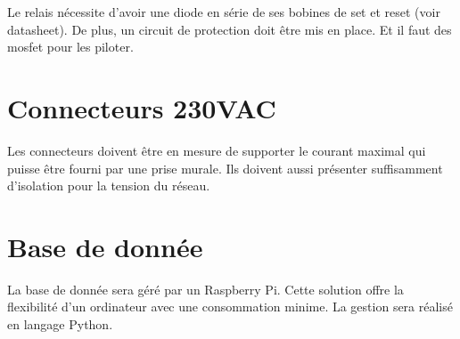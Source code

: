 Le relais nécessite d'avoir une diode en série de ses bobines de set et reset (voir datasheet).
De plus, un circuit de protection doit être mis en place. Et il faut des mosfet pour les piloter.

\section{Connecteurs 230VAC}
Les connecteurs doivent être en mesure de supporter le courant maximal qui puisse être fourni par une prise murale. Ils doivent aussi présenter suffisamment d'isolation pour la tension du réseau.


\section{Base de donnée}
La base de donnée sera géré par un Raspberry Pi. Cette solution offre la flexibilité d'un ordinateur avec une consommation minime. La gestion sera réalisé en langage Python.